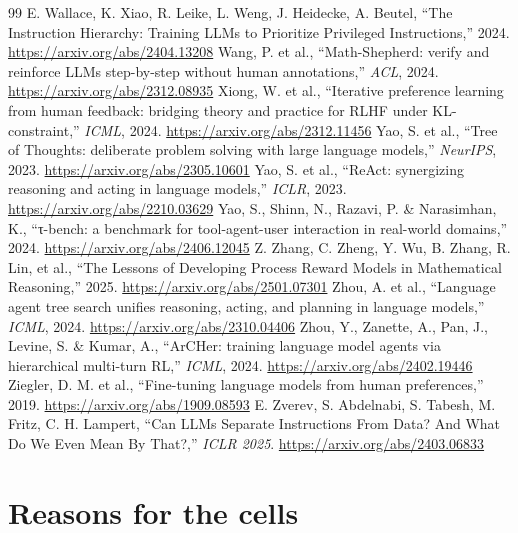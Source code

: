 \documentclass{article}
\begin{document}
\begin{thebibliography}{99}
 E. Wallace, K. Xiao, R. Leike, L. Weng, J. Heidecke, A. Beutel, ``The Instruction Hierarchy: Training LLMs to Prioritize Privileged Instructions,'' 2024. \url{https://arxiv.org/abs/2404.13208}
 Wang, P. et al., ``Math-Shepherd: verify and reinforce LLMs step-by-step without human annotations,'' \emph{ACL}, 2024. \url{https://arxiv.org/abs/2312.08935}
 Xiong, W. et al., ``Iterative preference learning from human feedback: bridging theory and practice for RLHF under KL-constraint,'' \emph{ICML}, 2024. \url{https://arxiv.org/abs/2312.11456}
 Yao, S. et al., ``Tree of Thoughts: deliberate problem solving with large language models,'' \emph{NeurIPS}, 2023. \url{https://arxiv.org/abs/2305.10601}
 Yao, S. et al., ``ReAct: synergizing reasoning and acting in language models,'' \emph{ICLR}, 2023. \url{https://arxiv.org/abs/2210.03629}
 Yao, S., Shinn, N., Razavi, P. \& Narasimhan, K., ``τ-bench: a benchmark for tool-agent-user interaction in real-world domains,'' 2024. \url{https://arxiv.org/abs/2406.12045}
 Z. Zhang, C. Zheng, Y. Wu, B. Zhang, R. Lin, et al., ``The Lessons of Developing Process Reward Models in Mathematical Reasoning,'' 2025. \url{https://arxiv.org/abs/2501.07301}
 Zhou, A. et al., ``Language agent tree search unifies reasoning, acting, and planning in language models,'' \emph{ICML}, 2024. \url{https://arxiv.org/abs/2310.04406}
 Zhou, Y., Zanette, A., Pan, J., Levine, S. \& Kumar, A., ``ArCHer: training language model agents via hierarchical multi-turn RL,'' \emph{ICML}, 2024. \url{https://arxiv.org/abs/2402.19446}
 Ziegler, D. M. et al., ``Fine-tuning language models from human preferences,'' 2019. \url{https://arxiv.org/abs/1909.08593}
 E. Zverev, S. Abdelnabi, S. Tabesh, M. Fritz, C. H. Lampert, ``Can LLMs Separate Instructions From Data? And What Do We Even Mean By That?,'' \emph{ICLR 2025}. \url{https://arxiv.org/abs/2403.06833}
\end{thebibliography}

\newpage
\appendix
\hypertarget{app:cells}{%
\section{Reasons for the cells}\label{app:cells}}
\end{document}
